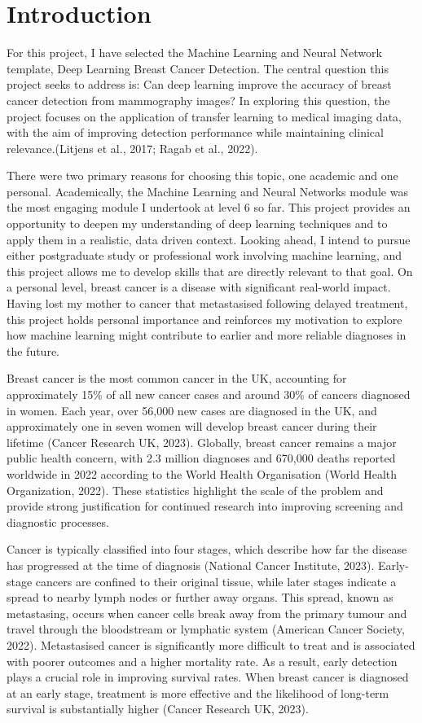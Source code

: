 \section{Introduction}

For this project, I have selected the Machine Learning and Neural Network template, Deep Learning
Breast Cancer Detection. The central question this project seeks to address is: Can deep learning improve
the accuracy of breast cancer detection from mammography images? In exploring this question, the
project focuses on the application of transfer learning to medical imaging data, with the aim of improving
detection performance while maintaining clinical relevance.(Litjens et al., 2017; Ragab et al., 2022).

There were two primary reasons for choosing this topic, one academic and one personal. Academically,
the Machine Learning and Neural Networks module was the most engaging module I undertook at level 6
so far. This project provides an opportunity to deepen my understanding of deep learning techniques and
to apply them in a realistic, data driven context. Looking ahead, I intend to pursue either postgraduate
study or professional work involving machine learning, and this project allows me to develop skills that
are directly relevant to that goal. On a personal level, breast cancer is a disease with significant real-world
impact. Having lost my mother to cancer that metastasised following delayed treatment, this project holds
personal importance and reinforces my motivation to explore how machine learning might contribute to
earlier and more reliable diagnoses in the future.

Breast cancer is the most common cancer in the UK, accounting for approximately 15\% of all new cancer
cases and around 30\% of cancers diagnosed in women. Each year, over 56,000 new cases are diagnosed
in the UK, and approximately one in seven women will develop breast cancer during their lifetime
(Cancer Research UK, 2023). Globally, breast cancer remains a major public health concern, with 2.3
million diagnoses and 670,000 deaths reported worldwide in 2022 according to the World Health
Organisation (World Health Organization, 2022). These statistics highlight the scale of the problem and
provide strong justification for continued research into improving screening and diagnostic processes.

Cancer is typically classified into four stages, which describe how far the disease has progressed at the
time of diagnosis (National Cancer Institute, 2023). Early-stage cancers are confined to their original
tissue, while later stages indicate a spread to nearby lymph nodes or further away organs. This spread,
known as metastasing, occurs when cancer cells break away from the primary tumour and travel through
the bloodstream or lymphatic system (American Cancer Society, 2022). Metastasised cancer is
significantly more difficult to treat and is associated with poorer outcomes and a higher mortality rate. As
a result, early detection plays a crucial role in improving survival rates. When breast cancer is diagnosed
at an early stage, treatment is more effective and the likelihood of long-term survival is substantially
higher (Cancer Research UK, 2023).

